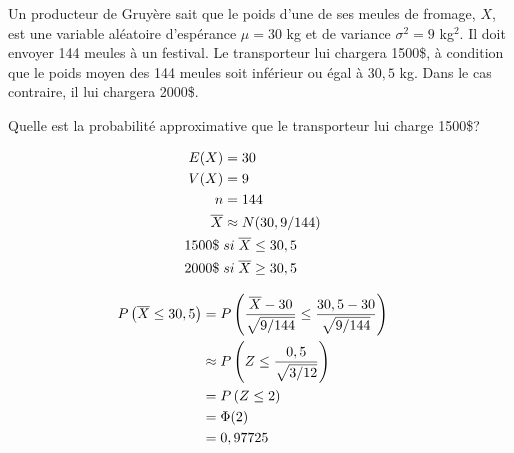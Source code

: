 \begin{questions}
\newpage

\question[8]
Un producteur de Gruyère sait que le poids d'une de ses meules de fromage, $X$, est une variable aléatoire d'espérance $\mu=30$ kg et de variance $\sigma^2 = 9$ kg$^2$. Il doit envoyer 144 meules à un festival. Le transporteur lui chargera 1500\$, à condition que le poids moyen des 144 meules soit inférieur ou égal à $30,5$ kg. Dans le cas contraire, il lui chargera 2000\$.

Quelle est la probabilité approximative que le transporteur lui charge 1500\$?
    \vspace{12cm}

\begin{solution}
    \begin{align*}
        E(X) &= 30 \cr
        V(X) &= 9 \cr
        n&= 144 \cr
        \overline{X} &\approx N(30, 9/144) \cr
        1500 \$ \; &si \; \overline{X} \leq 30,5 \cr
        2000 \$ \; &si \; \overline{X} \geq 30,5 
    \end{align*}

    \begin{align*}
        P\left( \overline{X} \leq 30,5 \right)
        &= P\left( \frac{\overline{X}-30}{\sqrt{9/144}} \leq \frac{30,5-30}{\sqrt{9/144}}  \right) \cr
        &\approx P\left( Z \leq \frac{0,5}{\sqrt{3/12}}  \right) \cr
        &= P\left( Z \leq 2 \right) \cr
        &= \Phi(2) \cr
        &= 0,97725
    \end{align*}
\end{solution}

\newpage



\newpage


\end{questions}
